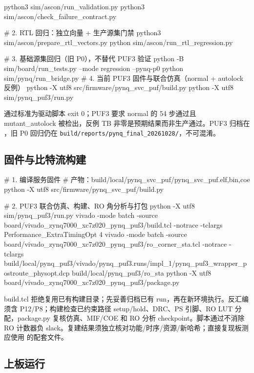 \begin{codeblock}[samepage=true]

python3 sim/ascon/run_validation.py
python3 sim/ascon/check_failure_contract.py

# 2. RTL 回归：独立向量 + 生产源集门禁
python3 sim/ascon/prepare_rtl_vectors.py
python sim/ascon/run_rtl_regression.py

# 3. 基础源集回归（旧 P0），不替代 PUF3 验证
python -B sim/board/run_tests.py --mode regression --pynq-p0
python sim/pynq/run_bridge.py
# 4. 当前 PUF3 固件与联合仿真（normal + autolock 反例）
python -X utf8 src/firmware/pynq_svc_puf/build.py
python -X utf8 sim/pynq_puf3/run.py
\end{codeblock}

通过标准为驱动脚本 exit 0；PUF3 要求 normal 的 54 步通过且 mutant\_autolock 被检出，反例 TB 非零是预期结果而非生产通过。PUF3 归档在 \pufreports，旧 P0 回归仍在 \texttt{build/reports/pynq\_final\_20261028/}，不可混淆。

\Needspace{128pt}

\subsection{固件与比特流构建}

\begin{codeblock}[samepage=true]
# 1. 编译服务固件
#    产物：build/local/pynq_svc_puf/pynq_svc_puf.{elf,bin,coe}
python -X utf8 src/firmware/pynq_svc_puf/build.py

# 2. PUF3 联合仿真、构建、RO 角分析与打包
python -X utf8 sim/pynq_puf3/run.py
vivado -mode batch -source board/vivado_zynq7000_xc7z020_pynq_puf3/build.tcl -notrace -tclargs Performance_ExtraTimingOpt 4
vivado -mode batch -source board/vivado_zynq7000_xc7z020_pynq_puf3/ro_corner_sta.tcl -notrace -tclargs build/local/pynq_puf3/vivado/pynq_puf3.runs/impl_1/pynq_puf3_wrapper_postroute_physopt.dcp build/local/pynq_puf3/ro_sta
python -X utf8 board/vivado_zynq7000_xc7z020_pynq_puf3/package.py
\end{codeblock}

build.tcl 拒绝复用已有构建目录；先妥善归档已有 run，再在新环境执行。反汇编须含 P12/P8；构建检查已约束路径 setup/hold、DRC、PS 引脚、RO LUT 分配，package.py 复核仿真、MIF/COE 和 RO 分析 checkpoint。脚本通过不消除 RO 计数器负 slack。复建结果须独立核对功能/时序/资源/新哈希；直接复现板测应使用 \pufcandidate 的配套文件。

\Needspace{206pt}

\subsection{上板运行}

